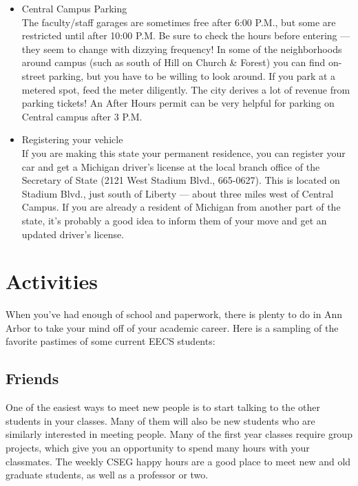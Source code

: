\documentclass[11pt]{article}
\begin{document}
\begin{itemize}
\item Central Campus Parking\\
\label{sec-11_4_1_5}%
The faculty/staff garages are sometimes free after 6:00 P.M., but some
are restricted until after 10:00 P.M.  Be sure to check the hours
before entering — they seem to change with dizzying frequency!  In
some of the neighborhoods around campus (such as south of Hill on
Church \& Forest) you can find on-street parking, but you have to be
willing to look around.  If you park at a metered spot, feed the meter
diligently. The city derives a lot of revenue from parking tickets!
An After Hours permit can be very helpful for parking on Central
campus after 3 P.M.


\item Registering your vehicle\\
\label{sec-11_4_1_6}%
If you are making this state your permanent residence, you can
register your car and get a Michigan driver's license at the local
branch office of the Secretary of State (2121 West Stadium Blvd.,
665-0627).  This is located on Stadium Blvd., just south of Liberty —
about three miles west of Central Campus.  If you are already a
resident of Michigan from another part of the state, it's probably a
good idea to inform them of your move and get an updated driver's
license.

\end{itemize} %
\section{Activities}
\label{sec-12}

When you've had enough of school and paperwork, there is plenty to do
in Ann Arbor to take your mind off of your academic career.  Here is a
sampling of the favorite pastimes of some current EECS students:
\subsection{Friends}
\label{sec-12_1}

One of the easiest ways to meet new people is to start talking to the
other students in your classes.  Many of them will also be new
students who are similarly interested in meeting people.  Many of the
first year classes require group projects, which give you an
opportunity to spend many hours with your classmates.  The weekly CSEG
happy hours are a good place to meet new and old graduate students, as
well as a professor or two.
\end{document}
